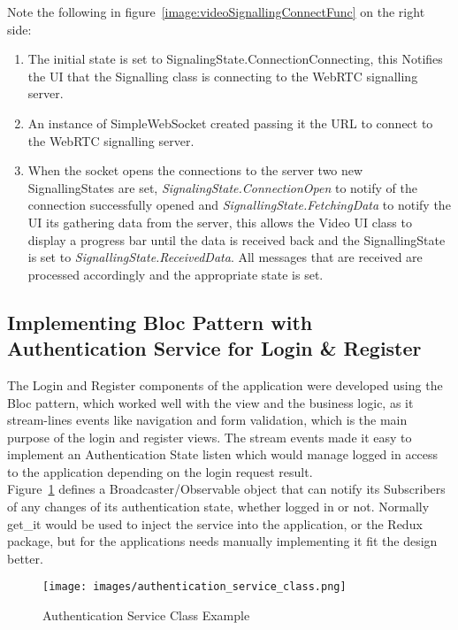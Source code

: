 Note the following in figure~\ref{image:videoSignallingConnectFunc} on the right side:
\begin{enumerate}
	\item The initial state is set to SignalingState.ConnectionConnecting, this Notifies the UI that the Signalling class is connecting to the WebRTC signalling server.
	\item An instance of SimpleWebSocket created passing it the URL to connect to the WebRTC signalling server.
    \item When the socket opens the connections to the server two new SignallingStates are set, \textit{SignalingState.ConnectionOpen} to notify of the connection successfully opened and \textit{SignallingState.FetchingData} to notify the UI its gathering data from the server, this allows the Video UI class to display a progress bar until the data is received back and the SignallingState is set to \textit{SignallingState.ReceivedData}. All messages that are received are processed accordingly and the appropriate state is set.
\end{enumerate}

\subsection{Implementing Bloc Pattern with Authentication Service for Login \& Register}
The Login and Register components of the application were developed using the Bloc pattern, which worked well with the view and the business logic, as it stream-lines events like navigation and form validation, which is the main purpose of the login and register views. The stream events made it easy to implement an Authentication State listen which would manage logged in access to the application depending on the login request result.
\\ Figure~\ref{image:authServiceClass} defines a Broadcaster/Observable object that can notify its Subscribers of any changes of its authentication state, whether logged in or not. Normally get\_it would be used to inject the service into the application, or the Redux package, but for the applications needs manually implementing it fit the design better.

\begin{figure}[h!]
    \caption{Authentication Service Class Example}
    \label{image:authServiceClass}
    \centering
    \texttt{[image: images/authentication\_service\_class.png]}
\end{figure}

